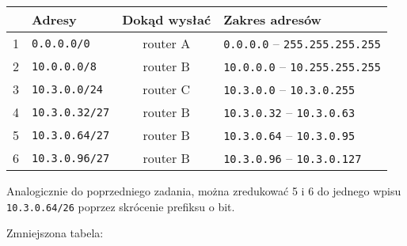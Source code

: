 \documentclass[a4paper, oneside]{article}
\begin{document}
\begin{description}
{        \begin{table}[H]
        \centering
        \begin{tabular}{|l|l|c|l|}
        \hline
            & \textbf{Adresy}     
            & \textbf{Dokąd wysłać} 
            & \textbf{Zakres adresów} \\ \hline \hline
        1   & \texttt{0.0.0.0/0}
            & \cellcolor{blue!35} router A 
            & \texttt{0.0.0.0} -- \texttt{255.255.255.255} \\ \hline
        2   & \texttt{10.0.0.0/8}
            & \cellcolor{green!35} router B
            & \texttt{10.0.0.0} -- \texttt{10.255.255.255} \\ \hline
        3   & \texttt{10.3.0.0/24}
            & \cellcolor{red!35} router C
            & \texttt{10.3.0.0} -- \texttt{10.3.0.255} \\ \hline
        4   & \texttt{10.3.0.32/27}
            & \cellcolor{green!35} router B
            & \texttt{10.3.0.32} -- \texttt{10.3.0.63} \\ \hline
        5   & \texttt{10.3.0.64/27}
            & \cellcolor{green!35} router B
            & \texttt{10.3.0.64} -- \texttt{10.3.0.95} \\ \hline
        6   & \texttt{10.3.0.96/27}
            & \cellcolor{green!35} router B
            & \texttt{10.3.0.96} -- \texttt{10.3.0.127} \\ \hline
        \end{tabular}
        \end{table}

        Analogicznie do poprzedniego zadania, można zredukować 5 i 6
        do jednego wpisu \texttt{10.3.0.64/26} poprzez skrócenie prefiksu
        o bit.
    
        Zmniejszona tabela:\\
        
}
\end{description}
\end{document}
